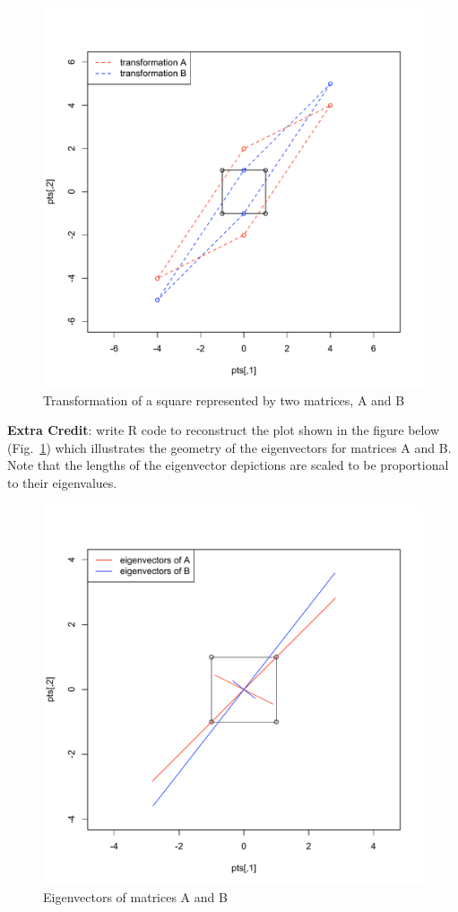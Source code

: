 \begin{figure}[htbp]
\centering
\includegraphics[width=0.5\columnwidth]{./figures/hands-on5/eigen-transform.pdf}
\caption{Transformation of a square represented by two matrices, A and
B}
\end{figure}

\begin{assignment}
\textbf{Extra Credit}: write R code to reconstruct the plot shown in the
figure below (Fig.~\ref{fig:eigen}) which illustrates the geometry of the eigenvectors for
matrices A and B. Note that the lengths of the eigenvector depictions
are scaled to be proportional to their eigenvalues.
\end{assignment}

\begin{figure}[htbp]
\centering
\includegraphics[width=0.5\columnwidth]{./figures/hands-on5/eigen-ECplot.pdf}
\caption{Eigenvectors of matrices A and B \label{fig:eigen}}
\end{figure}